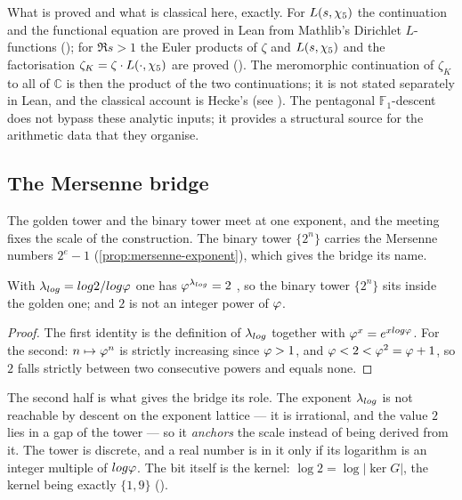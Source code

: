 \begin{remark}\label{rmk:remains-analytic}
What is proved and what is classical here, exactly.  For $L(s,\chi_5)$ the
continuation and the functional equation are proved in Lean from Mathlib's Dirichlet
$L$-functions (); for $\Re s>1$ the Euler products of $\zeta$
and $L(s,\chi_5)$ and the factorisation $\zeta_K=\zeta\cdot L(\cdot,\chi_5)$ are proved
().  The meromorphic continuation of
$\zeta_K$ to all of $\mathbb C$ is then the product of the two continuations; it is
not stated separately in Lean, and the classical account is Hecke's
\cite{hecke20} (see \cite[Ch.~VII]{neukirch99}).
The pentagonal $\mathbb{F}_1$-descent does not bypass these
analytic inputs; it provides a structural source for the
arithmetic data that they organise.
\end{remark}

\subsection{The Mersenne bridge}\label{sec:mersenne}

The golden tower and the binary tower meet at one exponent, and the meeting fixes
the scale of the construction.  The binary tower $\{2^n\}$ carries the Mersenne numbers $2^e-1$
(\cref{prop:mersenne-exponent}), which gives the bridge its name.

\begin{proposition}\label{prop:mersenne-bridge}
With $\lambda_{log}=log2/log\varphi$ one has $\varphi^{\lambda_{log}}=2$ , so the binary tower
$\{2^n\}$ sits inside the golden one; and $2$ is not an integer power of
$\varphi$.
\end{proposition}
\begin{proof}
The first identity is the definition of $\lambda_{log}$ together with
$\varphi^{x}=e^{xlog\varphi}$.  For the second: $n\mapsto\varphi^n$ is strictly
increasing since $\varphi>1$, and $\varphi<2<\varphi^2=\varphi+1$, so $2$ falls
strictly between two consecutive powers and equals none.
\end{proof}

The second half is what gives the bridge its role.  The exponent $\lambda_{log}$ is not
reachable by descent on the exponent lattice --- it is irrational, and the value
$2$ lies in a gap of the tower --- so it \emph{anchors} the scale instead of being
derived from it.  The
tower is discrete, and a real number is in it only if its logarithm is an integer
multiple of $log\varphi$.  The bit itself is the kernel: $\log2=\log|\ker G|$, the
kernel being exactly $\{1,9\}$ ().

